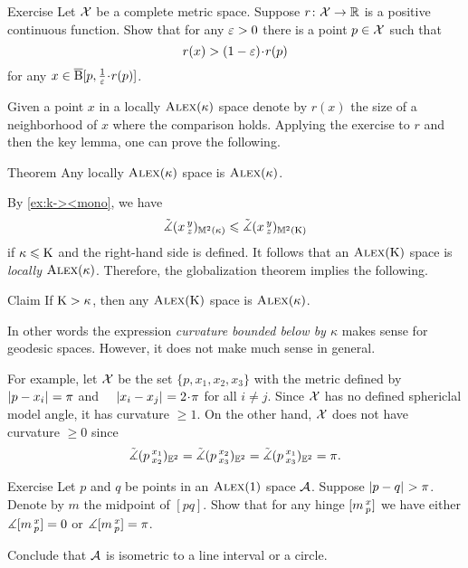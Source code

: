 \begin{thm}{Exercise}\label{ex:alm-min}
Let $\mathcal{X}$ be a complete metric space.
Suppose $r\colon\mathcal{X}\to \mathbb{R}$ is a positive continuous function.
Show that for any $\varepsilon>0$ there is a point $p\in \mathcal{X}$ such that 
\[r(x)> (1-\eps)\cdot r(p)\] 
for any $x\in \cBall[p,\tfrac{1}{\eps}\cdot r(p)]$.

\end{thm}

Given a point $x$ in a locally $\textsc{Alex}(\kappa)$ space denote by
$r(x)$ the size of a neighborhood of $x$ where the comparison holds.
Applying the exercise to $r$ and then the key lemma, one can prove the following.

\begin{thm}{Theorem}\label{thm:globalization+}
Any locally $\textsc{Alex}(\kappa)$ space is $\textsc{Alex}(\kappa)$.
\end{thm}

By \ref{ex:k-><mono}, we have
\[\tilde\measuredangle(x\,{}^{y}_{z})_{\mathbb{M}^2(\kappa)}\leqslant \tilde\measuredangle(x\,{}^{y}_{z})_{\mathbb{M}^2(\mathrm{K})}\]
if $\kappa\leqslant \mathrm{K}$ and the right-hand side is defined.
It follows that an $\textsc{Alex}(\mathrm{K})$ space is \textit{locally} $\textsc{Alex}(\kappa)$.
Therefore, the globalization theorem implies the following.

\begin{thm}{Claim}\label{clm:K>k}
If $\mathrm{K}>\kappa$, then any $\textsc{Alex}(\mathrm{K})$ space is $\textsc{Alex}(\kappa)$.
\end{thm}

In other words the expression \textit{curvature bounded below by $\kappa$} makes sense for geodesic spaces.
However, it does not make much sense in general.

For example,
let $\mathcal{X}$ be the set $\{p,x_1,x_2,x_3\}$ with the metric defined by $|{p}-{x_i}|_{}^{{}}=\pi$ and $\quad\dist{x_i}{x_j}{}=2\cdot\pi$
for all $i\ne j$.
Since $\mathcal{X}$ has no defined sphericlal model angle, it has curvature $\ge 1$.
On the other hand, $\mathcal{X}$ does not have curvature $\ge 0$ since
\[\tilde\measuredangle(p\,{}^{x_1}_{x_2})_{\mathbb{E}^2}=\tilde\measuredangle(p\,{}^{x_2}_{x_3})_{\mathbb{E}^2}=\tilde\measuredangle(p\,{}^{x_1}_{x_3})_{\mathbb{E}^2}=\pi.\]


\begin{thm}[!]{Exercise}\label{ex:RisCBB(1)}
Let $p$ and $q$ be points in an $\textsc{Alex}(1)$ space $\mathcal{A}$.
Suppose $|{p}-{q}|_{}^{{}}>\pi$.
Denote by $m$ the midpoint of $[pq]$.
Show that for any hinge $[m\,{}^{x}_{p}]$ we have
either $\measuredangle[m\,{}^{x}_{p}]=0$ or $\measuredangle[m\,{}^{x}_{p}]=\pi$.

Conclude that $\mathcal{A}$ is isometric to a line interval or a circle.

\end{thm}

